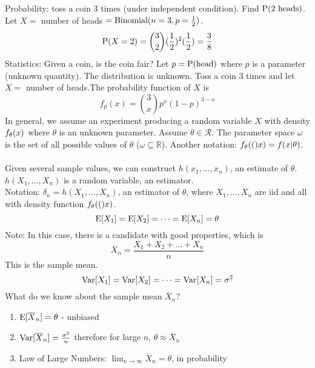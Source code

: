 \documentclass[12pt]{article}
\begin{document}
Probability: toss a coin 3 times (under independent condition). Find $\mathrm{P}( \text{2 heads} )$. Let $X = $ number of heads $= \text{Binomial}( n=3, p = \frac{1}{2} )$. $$ \mathrm{P}( X = 2 ) = \binom{3}{2}(\frac{1}{2})^2(\frac{1}{2}) = \frac{3}{8} $$ 
Statistics: Given a coin, is the coin fair? Let $p = \mathrm{P}( \text{head} )$ where $p$ is a parameter (unknown quantity). The distribution is unknown. Toss a coin 3 times and let $X = $ number of heads.The probability function of $X$ is $$f_p(x) = \binom{3}{x} p^x (1-p)^{3-x} $$ 
In general, we assume an experiment producing a random variable $X$ with density $f_{\theta}( x )$ where $\theta$ is an unknown parameter. Assume $\theta \in \mathcal{R}$. The parameter space $\omega$ is the set of all possible values of $\theta$ ($\omega \subseteq \mathbb{R}$). Another notation: $f_{\theta}( ( )x) = f(x|\theta)$. \\~\\
Given several sample values, we can construct $h(x_1,\dots,x_n)$, an estimate of $\theta$. $h(X_1,\dots,X_n)$ is a random variable, an estimator. \\
Notation: $\delta_n = h(X_1,\dots,X_n)$, an estimator of $\theta$, where $X_1,\dots, X_n$ are iid and all with density function $f_{\theta}( ( )x)$. 
$$\mathrm{E}[ X_1 ] = \mathrm{E}[ X_2 ] = \dots = \mathrm{E}[ X_n ] = \theta$$ 
Note: In this case, there is a candidate with good properties, which is $$ \overline{X}_n = \frac{X_1 + X_2 + \dots + X_n}{n}$$ This is the sample mean. 
$$ \mathrm{Var}[ X_1 ] = \mathrm{Var}[ X_2 ] = \dots = \mathrm{Var}[ X_n ] = \sigma^2 $$ 
What do we know about the sample mean $\overline{X}_n$? \begin{enumerate} 
\item $\mathrm{E}[ \overline{X}_n ] = \theta$ - unbiased
\item $\mathrm{Var}[ \overline{X}_n ] = \frac{\sigma^2}{n}$ therefore for large $n$, $\theta \approx \overline{X}_n$
\item Law of Large Numbers: $\lim_{n\to\infty} \overline{X}_n = \theta$, in probability \end{enumerate} 
\end{document}
